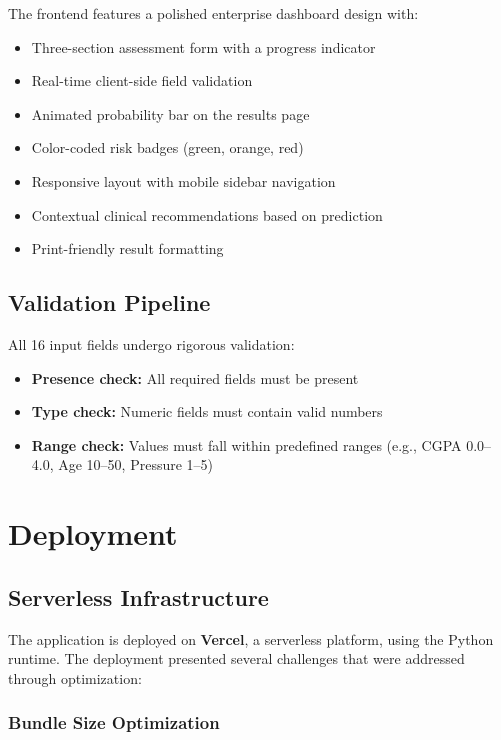 \documentclass[11pt,a4paper]{article}
\begin{document}
The frontend features a polished enterprise dashboard design with:
\begin{itemize}[leftmargin=*,nosep]
    \item Three-section assessment form with a progress indicator
    \item Real-time client-side field validation
    \item Animated probability bar on the results page
    \item Color-coded risk badges (green, orange, red)
    \item Responsive layout with mobile sidebar navigation
    \item Contextual clinical recommendations based on prediction
    \item Print-friendly result formatting
\end{itemize}

\subsection{Validation Pipeline}

All 16 input fields undergo rigorous validation:
\begin{itemize}[leftmargin=*,nosep]
    \item \textbf{Presence check:} All required fields must be present
    \item \textbf{Type check:} Numeric fields must contain valid numbers
    \item \textbf{Range check:} Values must fall within predefined ranges (e.g., CGPA 0.0--4.0, Age 10--50, Pressure 1--5)
\end{itemize}

\section{Deployment}
\label{sec:deployment}

\subsection{Serverless Infrastructure}

The application is deployed on \textbf{Vercel}, a serverless platform, using the Python runtime. The deployment presented several challenges that were addressed through optimization:

\nopagebreak
\subsubsection{Bundle Size Optimization}
\end{document}
